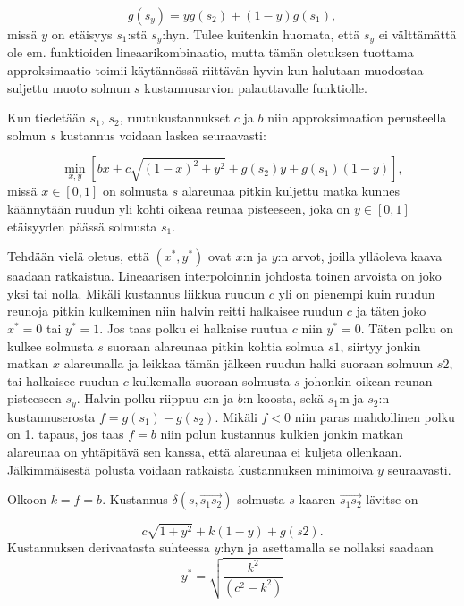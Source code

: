 \documentclass[finnish]{tktltiki2}
\theoremstyle{definition}
\theoremstyle{remark}
\begin{document}
\begin{equation}
	g(s_y) = yg(s_2)+(1-y)g(s_1),
\end{equation}
missä \(y\) on etäisyys \(s_1\):stä \(s_y\):hyn. Tulee kuitenkin huomata, että \(s_y\) ei välttämättä ole em. funktioiden lineaarikombinaatio, mutta tämän oletuksen tuottama approksimaatio toimii käytännössä riittävän hyvin kun halutaan muodostaa suljettu muoto solmun \(s\) kustannusarvion palauttavalle funktiolle.

Kun tiedetään \(s_1\), \(s_2\), ruutukustannukset \(c\) ja \(b\) niin approksimaation perusteella solmun \(s\) kustannus voidaan laskea seuraavasti:

\begin{equation}
	\min_{x,y}[bx+c\sqrt{(1-x)^2+y^2}+g(s_2)y+g(s_1)(1-y)],
\end{equation}
missä $x \in [0,1]$ on solmusta $s$ alareunaa pitkin kuljettu matka kunnes käännytään ruudun yli kohti oikeaa reunaa pisteeseen, joka on $y \in [0,1]$ etäisyyden päässä solmusta $s_1$.

Tehdään vielä oletus, että \((x^*, y^*)\) ovat \(x\):n ja \(y\):n arvot, joilla ylläoleva kaava saadaan ratkaistua. Lineaarisen interpoloinnin johdosta toinen arvoista on joko yksi tai nolla. Mikäli kustannus liikkua ruudun \(c\) yli on pienempi kuin ruudun reunoja pitkin kulkeminen niin halvin reitti halkaisee ruudun \(c\) ja täten joko \(x^* = 0\) tai \(y^* = 1\). Jos taas polku ei halkaise ruutua \(c\) niin \(y^* = 0\). Täten polku on kulkee solmusta \(s\) suoraan alareunaa pitkin kohtia solmua \(s1\), siirtyy jonkin matkan \(x\) alareunalla ja leikkaa tämän jälkeen ruudun halki suoraan solmuun \(s2\), tai halkaisee ruudun \(c\) kulkemalla suoraan solmusta \(s\) johonkin oikean reunan pisteeseen \(s_y\). Halvin polku riippuu \(c\):n ja \(b\):n koosta, sekä \(s_1\):n ja \(s_2\):n kustannuserosta \(f = g(s_1) - g(s_2)\). Mikäli \(f < 0\) niin paras mahdollinen polku on 1. tapaus, jos taas \(f = b\) niin polun kustannus kulkien jonkin matkan alareunaa on yhtäpitävä sen kanssa, että alareunaa ei kuljeta ollenkaan. Jälkimmäisestä polusta voidaan ratkaista kustannuksen minimoiva \(y\) seuraavasti.

Olkoon $k = f = b$. Kustannus $\delta(s, \overrightarrow{s_1s_2})$ solmusta $s$ kaaren $\overrightarrow{s_1s_2}$ lävitse on

\begin{equation}
	c\sqrt{1+y^2}+k(1-y)+g(s2).
\end{equation}
Kustannuksen derivaatasta suhteessa \(y\):hyn ja asettamalla se nollaksi saadaan
\[y^* = \sqrt{\frac{k^2}{(c^2-k^2)}}\]
\end{document}
